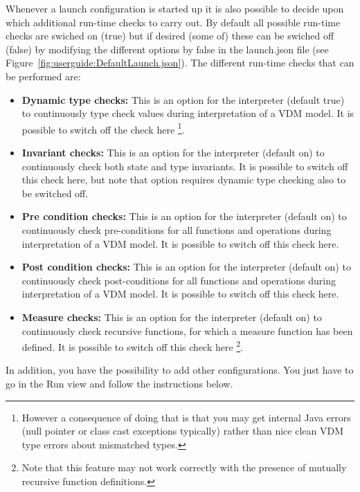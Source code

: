 \documentclass{overturerepchap}
\begin{document}
Whenever a launch configuration is started up it is also possible to decide upon which additional
run-time checks to carry out. By default all possible run-time checks are swiched on (true) but if desired
(some of) these can be swiched off (false) by modifying the different options by false in the launch.json file (see Figure~\ref{fig:userguide:DefaultLaunch.json}). The different run-time checks that can be performed are:
 \begin{itemize}
    \item \textbf{Dynamic type checks:} This is an option for the interpreter (default true) to continuously type check values during interpretation of a VDM model. It is possible to switch off the check here \footnote{However a consequence of doing that is that you may get internal Java errors (null pointer or class cast exceptions typically) rather than nice clean VDM type errors about mismatched types.}.
    \item \textbf{Invariant checks:} This is an option for the interpreter (default on) to continuously check both
    state and type invariants. It is possible to switch off this check here, but note that option
    requires dynamic type checking also to be switched off.
    \item \textbf{Pre condition checks:} This is an option for the interpreter (default on) to continuously check
    pre-conditions for all functions and operations during interpretation of a VDM model. It is
    possible to switch off this check here.
    \item \textbf{Post condition checks:} This is an option for the interpreter (default on) to continuously check
    post-conditions for all functions and operations during interpretation of a VDM model. It is
    possible to switch off this check here.
    \item \textbf{Measure checks:} This is an option for the interpreter (default on) to continuously check recursive
    functions, for which a measure function has been defined. It is possible to switch off this
    check here \footnote{Note that this feature may not work correctly with the presence of mutually recursive function definitions.}.
 \end{itemize}
 



In addition, you have the possibility to add other configurations. You just have to go in the Run view and follow the instructions below.
\end{document}
